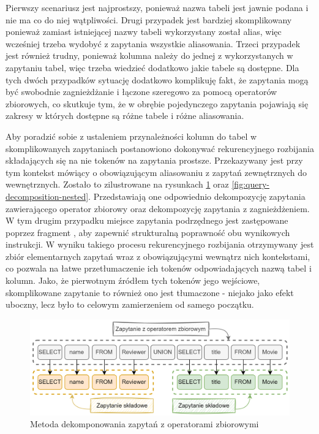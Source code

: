 Pierwszy scenariusz jest najprostszy, ponieważ nazwa tabeli jest jawnie podana i nie ma co do niej wątpliwości. Drugi przypadek jest bardziej skomplikowany ponieważ zamiast istniejącej nazwy tabeli wykorzystany został alias, więc wcześniej trzeba wydobyć z zapytania wszystkie aliasowania. Trzeci przypadek jest również trudny, ponieważ kolumna należy do jednej z wykorzystanych w zapytaniu tabel, więc trzeba wiedzieć dodatkowo jakie tabele są dostępne. Dla tych dwóch przypadków sytuację dodatkowo komplikuję fakt, że zapytania mogą być swobodnie zagnieżdżanie i łączone szeregowo za pomocą operatorów zbiorowych, co skutkuje tym, że w obrębie pojedynczego zapytania pojawiają się zakresy w których dostępne są różne tabele i różne aliasowania.

Aby poradzić sobie z ustaleniem przynależności kolumn do tabel w skomplikowanych zapytaniach postanowiono dokonywać rekurencyjnego rozbijania składających się na nie tokenów na zapytania prostsze. Przekazywany jest przy tym kontekst mówiący o obowiązującym aliasowaniu z zapytań zewnętrznych do wewnętrznych. Zostało to zilustrowane na rysunkach 
\ref{fig:query-decomposition-serial} oraz \ref{fig:query-decomposition-nested}. Przedstawiają one odpowiednio dekompozycję zapytania zawierającego operator zbiorowy oraz dekompozycję zapytania z zagnieżdżeniem. W tym drugim przypadku miejsce zapytania podrzędnego jest zastępowane poprzez fragment , aby zapewnić strukturalną poprawność obu wynikowych instrukcji. W wyniku takiego procesu rekurencyjnego rozbijania otrzymywany jest zbiór elementarnych zapytań wraz z obowiązującymi wewnątrz nich kontekstami, co pozwala na łatwe przetłumaczenie ich tokenów odpowiadających nazwą tabel i kolumn. Jako, że pierwotnym źródłem tych tokenów jego wejściowe, skomplikowane zapytanie to również ono jest tłumaczone - niejako jako efekt uboczny, lecz było to celowym zamierzeniem od samego początku.


\begin{figure}[ht!]
  \centering
  \includegraphics[width=1.0\linewidth]{images/query_decomposition_serial.png}
  \caption{Metoda dekomponowania zapytań z operatorami zbiorowymi}
  \label{fig:query-decomposition-serial}
\end{figure}

